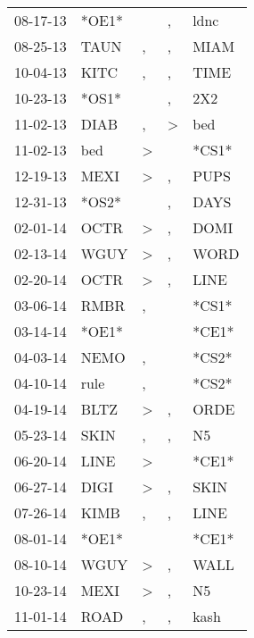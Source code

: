 \begin{supertabular}{lllll}
 08-17-13 &  *OE1* &                  &                , &   ldnc \\
 08-25-13 &   TAUN &                , &                , &   MIAM \\
 10-04-13 &   KITC &                , &                , &   TIME \\
 10-23-13 &  *OS1* &                  &                , &    2X2 \\
 11-02-13 &   DIAB &                , &     \textgreater &    bed \\
 11-02-13 &    bed &     \textgreater &                  &  *CS1* \\
 12-19-13 &   MEXI &     \textgreater &                , &   PUPS \\
 12-31-13 &  *OS2* &                  &                , &   DAYS \\
 02-01-14 &   OCTR &     \textgreater &                , &   DOMI \\
 02-13-14 &   WGUY &     \textgreater &                , &   WORD \\
 02-20-14 &   OCTR &     \textgreater &                , &   LINE \\
 03-06-14 &   RMBR &                , &                  &  *CS1* \\
 03-14-14 &  *OE1* &                  &                  &  *CE1* \\
 04-03-14 &   NEMO &                , &                  &  *CS2* \\
 04-10-14 &   rule &                , &                  &  *CS2* \\
 04-19-14 &   BLTZ &     \textgreater &                , &   ORDE \\
 05-23-14 &   SKIN &                , &                , &     N5 \\
 06-20-14 &   LINE &     \textgreater &                  &  *CE1* \\
 06-27-14 &   DIGI &     \textgreater &                , &   SKIN \\
 07-26-14 &   KIMB &                , &                , &   LINE \\
 08-01-14 &  *OE1* &                  &                  &  *CE1* \\
 08-10-14 &   WGUY &     \textgreater &                , &   WALL \\
 10-23-14 &   MEXI &     \textgreater &                , &     N5 \\
 11-01-14 &   ROAD &                , &                , &   kash \\

\end{supertabular}

